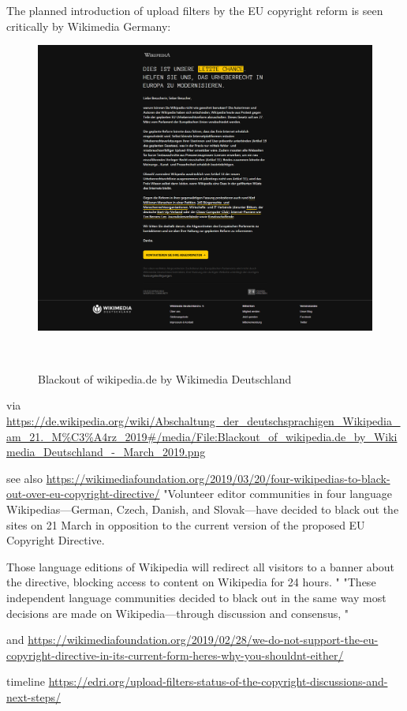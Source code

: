 The planned introduction of upload filters by the EU copyright reform is seen critically by Wikimedia Germany:
\begin{figure}
\centering
  \includegraphics[width=0.9\columnwidth]{pics/Blackout_of_wikipediade_by_Wikimedia_Deutschland_-_March_2019.png}
  \caption{Blackout of wikipedia.de by Wikimedia Deutschland}~\label{fig:blackout-upload-filters}
\end{figure}

via
\url{https://de.wikipedia.org/wiki/Abschaltung_der_deutschsprachigen_Wikipedia_am_21._M%C3%A4rz_2019#/media/File:Blackout_of_wikipedia.de_by_Wikimedia_Deutschland_-_March_2019.png}

see also
\url{https://wikimediafoundation.org/2019/03/20/four-wikipedias-to-black-out-over-eu-copyright-directive/}
"Volunteer editor communities in four language Wikipedias—German, Czech, Danish, and Slovak—have decided to black out the sites on 21 March in opposition to the current version of the proposed EU Copyright Directive.

Those language editions of Wikipedia will redirect all visitors to a banner about the directive, blocking access to content on Wikipedia for 24 hours. "
"These independent language communities decided to black out in the same way most decisions are made on Wikipedia—through discussion and consensus, "

and
\url{https://wikimediafoundation.org/2019/02/28/we-do-not-support-the-eu-copyright-directive-in-its-current-form-heres-why-you-shouldnt-either/}

timeline
\url{https://edri.org/upload-filters-status-of-the-copyright-discussions-and-next-steps/}

